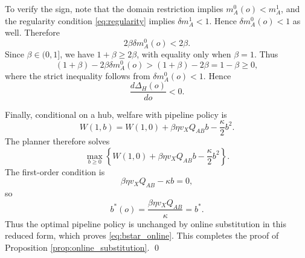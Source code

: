 To verify the sign, note that the domain restriction implies $m_A^0(o)<m_A^1$, and the regularity condition \eqref{eq:regularity} implies $\delta m_A^1<1$. Hence $\delta m_A^0(o)<1$ as well. Therefore
\[
2\beta\delta m_A^0(o)<2\beta.
\]
Since $\beta\in(0,1]$, we have $1+\beta\ge 2\beta$, with equality only when $\beta=1$. Thus
\[
(1+\beta)-2\beta\delta m_A^0(o)>(1+\beta)-2\beta=1-\beta\ge 0,
\]
where the strict inequality follows from $\delta m_A^0(o)<1$. Hence
\[
\frac{d\Delta_H(o)}{do}<0.
\]

Finally, conditional on a hub, welfare with pipeline policy is
\[
W(1,b)=W(1,0)+\beta\eta v_XQ_{AB}b-\frac{\kappa}{2}b^2.
\]
The planner therefore solves
\[
\max_{b\ge 0}
\left\{
W(1,0)+\beta\eta v_XQ_{AB}b-\frac{\kappa}{2}b^2
\right\}.
\]
The first-order condition is
\[
\beta\eta v_XQ_{AB}-\kappa b=0,
\]
so
\[
b^*(o)=\frac{\beta\eta v_XQ_{AB}}{\kappa}=b^*.
\]
Thus the optimal pipeline policy is unchanged by online substitution in this reduced form, which proves \eqref{eq:bstar_online}. This completes the proof of Proposition \ref{prop:online_substitution}.
\qed
